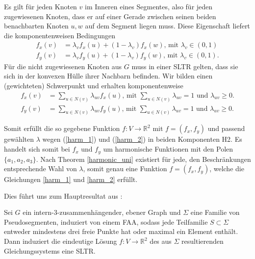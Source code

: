 Es gilt für jeden Knoten $v$ im Inneren eines Segmentes, also für jeden zugewiesenen Knoten, dass er auf einer Gerade zwischen seinen beiden benachbarten Knoten $u,w$ auf dem Segment liegen muss. Diese Eigenschaft liefert die komponentenweisen Bedingungen 
\begin{equation}\label{harm_1}
\begin{split}
f_x(v) &= \lambda_v f_x(u) + (1-\lambda_v)f_x(w) \text{, mit } \lambda_v \in (0,1)\\
f_y(v) &= \lambda_v f_y(u) + (1-\lambda_v)f_y(w) \text{, mit } \lambda_v \in (0,1).
\end{split}
\end{equation}
Für die nicht zugewiesenen Knoten aus $G$ muss in einer SLTR gelten, dass sie sich in der konvexen Hülle ihrer Nachbarn befinden. Wir bilden einen (gewichteten) Schwerpunkt und erhalten komponentenweise 
\begin{equation}\label{harm_2}
\begin{split}
f_x(v) &= \sum_{u \in N(v)} \lambda_{uv} f_x(u) \text{, mit }  \sum_{u \in N(v)}\lambda_{uv} = 1 \text{ und } \lambda_{uv} \geq 0.\\
f_y(v) &= \sum_{u \in N(v)} \lambda_{uv} f_y(u) \text{, mit }  \sum_{u \in N(v)}\lambda_{uv} = 1 \text{ und } \lambda_{uv} \geq 0.
\end{split}
\end{equation}

Somit erfüllt die so gegebene Funktion $f:V\to\mathbb{R}^2$ mit $f=(f_x,f_y)$ und passend gewählten $\lambda$ wegen (\ref{harm_1}) und (\ref{harm_2}) in beiden Komponenten H2. Es handelt sich somit bei $f_x$ und $f_y$ um harmonische Funktionen mit den Polen $\{a_1,a_2,a_3\}$. Nach Theorem \ref{harmonic_uni} existiert für jede, den Beschränkungen entsprechende Wahl von $\lambda$, somit genau eine Funktion $f=(f_x,f_y)$, welche die Gleichungen \ref{harm_1} und \ref{harm_2} erfüllt.

Dies führt uns zum Hauptresultat aus \cite{af13}:

\begin{theorem}\label{com_theo}
Sei $G$ ein intern-3-zusammenhängender, ebener Graph und $\Sigma$ eine Familie von Pseudosegmenten, induziert von einem FAA, sodass jede Teilfamilie $S \subset \Sigma$ entweder mindestens drei freie Punkte hat oder maximal ein Element enthält. Dann induziert die eindeutige Lösung $f:V\to \mathbb{R}^2$ des aus $\Sigma$ resultierenden Gleichungssystems eine SLTR. 
\end{theorem}

